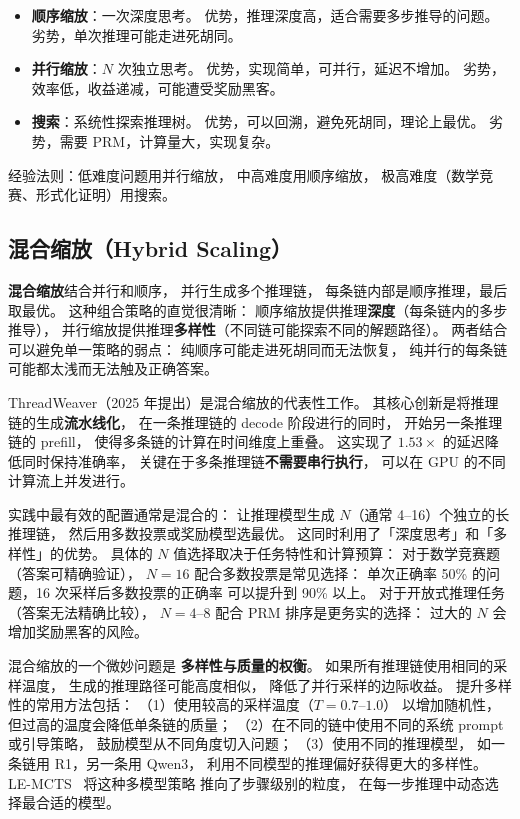 \begin{keybox}[推理时计算策略对比]
\begin{itemize}[noitemsep]
  \item \textbf{顺序缩放}：一次深度思考。
        优势，推理深度高，适合需要多步推导的问题。
        劣势，单次推理可能走进死胡同。
  \item \textbf{并行缩放}：$N$ 次独立思考。
        优势，实现简单，可并行，延迟不增加。
        劣势，效率低，收益递减，可能遭受奖励黑客。
  \item \textbf{搜索}：系统性探索推理树。
        优势，可以回溯，避免死胡同，理论上最优。
        劣势，需要 PRM，计算量大，实现复杂。
\end{itemize}
经验法则：低难度问题用并行缩放，
中高难度用顺序缩放，
极高难度（数学竞赛、形式化证明）用搜索。
\end{keybox}

\subsection{混合缩放（Hybrid Scaling）}

\textbf{混合缩放}结合并行和顺序，
并行生成多个推理链，
每条链内部是顺序推理，最后取最优。
这种组合策略的直觉很清晰：
顺序缩放提供推理\textbf{深度}（每条链内的多步推导），
并行缩放提供推理\textbf{多样性}（不同链可能探索不同的解题路径）。
两者结合可以避免单一策略的弱点：
纯顺序可能走进死胡同而无法恢复，
纯并行的每条链可能都太浅而无法触及正确答案。

ThreadWeaver（2025 年提出）是混合缩放的代表性工作。
其核心创新是将推理链的生成\textbf{流水线化}，
在一条推理链的 decode 阶段进行的同时，
开始另一条推理链的 prefill，
使得多条链的计算在时间维度上重叠。
这实现了 $1.53\times$ 的延迟降低同时保持准确率，
关键在于多条推理链\textbf{不需要串行执行}，
可以在 GPU 的不同计算流上并发进行。

实践中最有效的配置通常是混合的：
让推理模型生成 $N$（通常 4--16）个独立的长推理链，
然后用多数投票或奖励模型选最优。
这同时利用了「深度思考」和「多样性」的优势。
具体的 $N$ 值选择取决于任务特性和计算预算：
对于数学竞赛题（答案可精确验证），
$N = 16$ 配合多数投票是常见选择：
单次正确率 50\% 的问题，16 次采样后多数投票的正确率
可以提升到 90\% 以上。
对于开放式推理任务（答案无法精确比较），
$N = 4$--$8$ 配合 PRM 排序是更务实的选择：
过大的 $N$ 会增加奖励黑客的风险。

混合缩放的一个微妙问题是
\textbf{多样性与质量的权衡}。
如果所有推理链使用相同的采样温度，
生成的推理路径可能高度相似，
降低了并行采样的边际收益。
提升多样性的常用方法包括：
（1）使用较高的采样温度（$T = 0.7$--$1.0$）
以增加随机性，但过高的温度会降低单条链的质量；
（2）在不同的链中使用不同的系统 prompt 或引导策略，
鼓励模型从不同角度切入问题；
（3）使用不同的推理模型，
如一条链用 R1，另一条用 Qwen3，
利用不同模型的推理偏好获得更大的多样性。
LE-MCTS~\cite{park2025lemcts} 将这种多模型策略
推向了步骤级别的粒度，
在每一步推理中动态选择最合适的模型。

